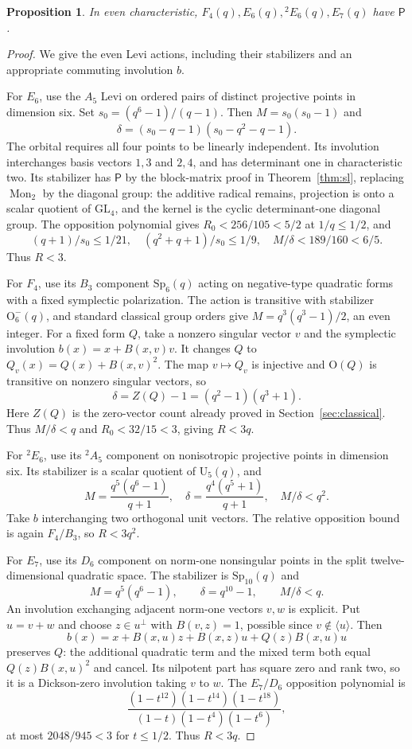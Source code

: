 \documentclass[11pt]{article}
\newtheorem{proposition}[theorem]{Proposition}
\theoremstyle{definition}
\newcommand{\Pp}{\mathsf P}
\newcommand{\GL}{\mathrm{GL}}
\newcommand{\Sp}{\mathrm{Sp}}
\newcommand{\U}{\mathrm U}
\newcommand{\Ogrp}{\mathrm O}
\begin{document}
\begin{proposition}\label{prop:fourtypes}
In even characteristic, $F_4(q),E_6(q),{}^2E_6(q),E_7(q)$ have $\Pp$.
\end{proposition}
\begin{proof}
We give the even Levi actions, including their stabilizers and an appropriate commuting involution $b$.

For $E_6$, use the $A_5$ Levi on ordered pairs of distinct projective points in dimension six. Set $s_0=(q^6-1)/(q-1)$. Then $M=s_0(s_0-1)$ and
\[
\delta=(s_0-q-1)(s_0-q^2-q-1).
\]
The orbital requires all four points to be linearly independent. Its involution interchanges basis vectors $1,3$ and $2,4$, and has determinant one in characteristic two. Its stabilizer has $\Pp$ by the block-matrix proof in Theorem~\ref{thm:sl}, replacing $\operatorname{Mon}_2$ by the diagonal group: the additive radical remains, projection is onto a scalar quotient of $\GL_4$, and the kernel is the cyclic determinant-one diagonal group. The opposition polynomial gives $R_0<256/105<5/2$ at $1/q\le1/2$, and
\[
(q+1)/s_0\le1/21,\quad(q^2+q+1)/s_0\le1/9,\quad
M/\delta<189/160<6/5.
\]
Thus $R<3$.

For $F_4$, use its $B_3$ component $\Sp_6(q)$ acting on negative-type quadratic forms with a fixed symplectic polarization. The action is transitive with stabilizer $\Ogrp_6^-(q)$, and standard classical group orders give $M=q^3(q^3-1)/2$, an even integer. For a fixed form $Q$, take a nonzero singular vector $v$ and the symplectic involution $b(x)=x+B(x,v)v$. It changes $Q$ to $Q_v(x)=Q(x)+B(x,v)^2$. The map $v\mapsto Q_v$ is injective and $\Ogrp(Q)$ is transitive on nonzero singular vectors, so
\[
\delta=Z(Q)-1=(q^2-1)(q^3+1).
\]
Here $Z(Q)$ is the zero-vector count already proved in Section~\ref{sec:classical}. Thus $M/\delta<q$ and $R_0<32/15<3$, giving $R<3q$.

For $^2E_6$, use its $^2A_5$ component on nonisotropic projective points in dimension six. Its stabilizer is a scalar quotient of $\U_5(q)$, and
\[
M=\frac{q^5(q^6-1)}{q+1},\quad
\delta=\frac{q^4(q^5+1)}{q+1},\quad M/\delta<q^2.
\]
Take $b$ interchanging two orthogonal unit vectors. The relative opposition bound is again $F_4/B_3$, so $R<3q^2$.

For $E_7$, use its $D_6$ component on norm-one nonsingular points in the split twelve-dimensional quadratic space. The stabilizer is $\Sp_{10}(q)$ and
\[
M=q^5(q^6-1),\qquad \delta=q^{10}-1,\qquad M/\delta<q.
\]
An involution exchanging adjacent norm-one vectors $v,w$ is explicit. Put $u=v+w$ and choose $z\in u^\perp$ with $B(v,z)=1$, possible since $v\notin\langle u\rangle$. Then
\[
b(x)=x+B(x,u)z+B(x,z)u+Q(z)B(x,u)u
\]
preserves $Q$: the additional quadratic term and the mixed term both equal $Q(z)B(x,u)^2$ and cancel. Its nilpotent part has square zero and rank two, so it is a Dickson-zero involution taking $v$ to $w$. The $E_7/D_6$ opposition polynomial is
\[
\frac{(1-t^{12})(1-t^{14})(1-t^{18})}{(1-t)(1-t^4)(1-t^6)},
\]
at most $2048/945<3$ for $t\le1/2$. Thus $R<3q$.


\end{proof}
\end{document}
